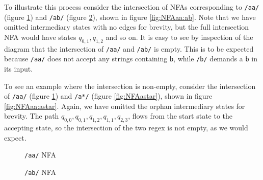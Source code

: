 To illustrate this process consider the intersection of NFAs corresponding
to \verb'/aa/' (figure \ref{fig:NFAaa}) and \verb'/ab/'
(figure \ref{fig:NFAab}), shown in figure \ref{fig:NFAaa:ab}. Note that
we have omitted intermediary states with no edges for brevity, but the
full intersection NFA would have states $q_{0,1}, q_{1,2}$ and so on.
It is easy to see by inspection of the diagram that the intersection of
\verb'/aa/' and \verb'/ab/' is empty. This is to be expected because
\verb'/aa/' does not accept any strings containing \verb'b', while
\verb'/b/' demands a \verb'b' in its input.

To see an example where the intersection is non-empty, consider the
intersection of \verb'/aa/' (figure \ref{fig:NFAaa}) and \verb'/a*/'
(figure \ref{fig:NFAastar}), shown in figure \ref{fig:NFAaa:astar}.
Again, we have omitted the orphan intermediary states for brevity.
The path $q_{0,0}, q_{0,1}, q_{1,2}, q_{1,1}, q_{2,3}$, flows from
the start state to the accepting state, so the intersection of the
two regex is not empty, as we would expect.

\begin{figure}
\centering
\caption{{\tt /aa/} NFA}
\label{fig:NFAaa}
\end{figure}

\begin{figure}
\centering
\caption{{\tt /ab/} NFA}
\label{fig:NFAab}
\end{figure}

